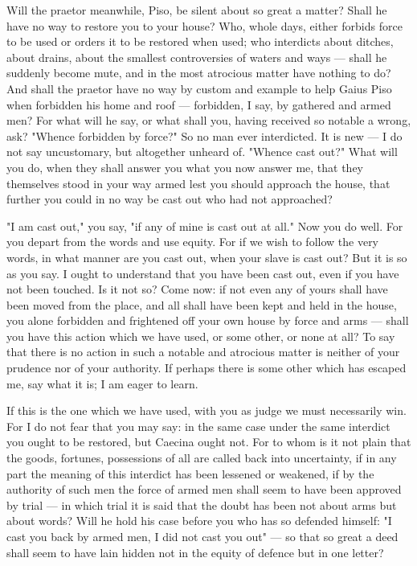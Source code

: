  Will the praetor meanwhile, Piso, be silent about so great a matter? Shall he have no way to restore you to your house? Who, whole days, either forbids force to be used or orders it to be restored when used; who interdicts about ditches, about drains, about the smallest controversies of waters and ways --- shall he suddenly become mute, and in the most atrocious matter have nothing to do? And shall the praetor have no way by custom and example to help Gaius Piso when forbidden his home and roof --- forbidden, I say, by gathered and armed men? For what will he say, or what shall you, having received so notable a wrong, ask? "Whence forbidden by force?" So no man ever interdicted. It is new --- I do not say uncustomary, but altogether unheard of. "Whence cast out?" What will you do, when they shall answer you what you now answer me, that they themselves stood in your way armed lest you should approach the house, that further you could in no way be cast out who had not approached?

 "I am cast out," you say, "if any of mine is cast out at all." Now you do well. For you depart from the words and use equity. For if we wish to follow the very words, in what manner are you cast out, when your slave is cast out? But it is so as you say. I ought to understand that you have been cast out, even if you have not been touched. Is it not so? Come now: if not even any of yours shall have been moved from the place, and all shall have been kept and held in the house, you alone forbidden and frightened off your own house by force and arms --- shall you have this action which we have used, or some other, or none at all? To say that there is no action in such a notable and atrocious matter is neither of your prudence nor of your authority. If perhaps there is some other which has escaped me, say what it is; I am eager to learn.

 If this is the one which we have used, with you as judge we must necessarily win. For I do not fear that you may say: in the same case under the same interdict you ought to be restored, but Caecina ought not. For to whom is it not plain that the goods, fortunes, possessions of all are called back into uncertainty, if in any part the meaning of this interdict has been lessened or weakened, if by the authority of such men the force of armed men shall seem to have been approved by trial --- in which trial it is said that the doubt has been not about arms but about words? Will he hold his case before you who has so defended himself: "I cast you back by armed men, I did not cast you out" --- so that so great a deed shall seem to have lain hidden not in the equity of defence but in one letter?


